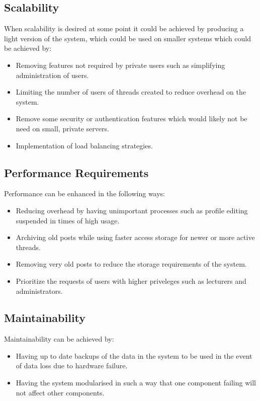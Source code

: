 
\subsection{Scalability}
	\begin{flushleft}
When scalability is desired at some point it could be achieved by producing a light version of the system, which could be used on smaller systems which could be achieved by:
\begin{itemize}
\item Removing features not required by private users such as simplifying administration of users.
\item Limiting the number of users of threads created to reduce overhead on the system.
\item Remove some security or authentication features which would likely not be need on small, private servers.
\item Implementation of load balancing strategies.

\end{itemize}
	\end{flushleft}
	
\subsection{Performance Requirements}
\begin{flushleft}
Performance can be enhanced in the following ways:
\begin{itemize}
\item Reducing overhead by having unimportant processes such as profile editing suspended in times of high usage.
\item Archiving old posts while using faster access storage for newer or more active threads.
\item Removing very old posts to reduce the storage requirements of the system.
\item Prioritize the requests of users with higher priveleges such as lecturers and administrators.

\end{itemize}

\end{flushleft}

\subsection{Maintainability}
\begin{flushleft}
Maintainability can be achieved by:
\begin{itemize}
\item Having up to date backups of the data in the system to be used in the event of data loss due to hardware failure.
\item Having the system modularised in such a way that one component failing will not affect other components.

\end{itemize}

\end{flushleft}

